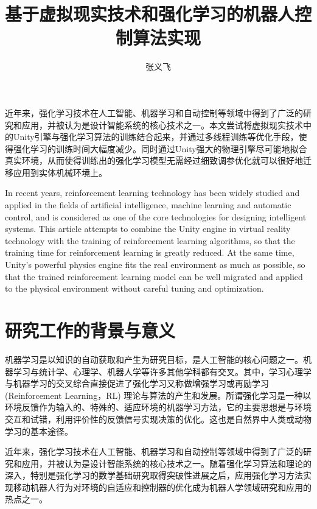 \documentclass[bachelor]{thesis-uestc}
\title{基于虚拟现实技术和强化学习的机器人控制算法实现}
\author{张义飞}
\begin{document}
	
	\begin{chineseabstract}
		近年来，强化学习技术在人工智能、机器学习和自动控制等领域中得到了广泛的研究和应用，并被认为是设计智能系统的核心技术之一。本文尝试将虚拟现实技术中的Unity引擎与强化学习算法的训练结合起来，并通过多线程训练等优化手段，使得强化学习的训练时间大幅度减少。同时通过Unity强大的物理引擎尽可能地拟合真实环境，从而使得训练出的强化学习模型无需经过细致调参优化就可以很好地迁移应用到实体机械环境上。
		
	\end{chineseabstract}
	
	\begin{englishabstract}
		In recent years, reinforcement learning technology has been widely studied and applied in the fields of artificial intelligence, machine learning and automatic control, and is considered as one of the core technologies for designing intelligent systems. This article attempts to combine the Unity engine in virtual reality technology with the training of reinforcement learning algorithms, so that the training time for reinforcement learning is greatly reduced. At the same time, Unity's powerful physics engine fits the real environment as much as possible, so that the trained reinforcement learning model can be well migrated and applied to the physical environment without careful tuning and optimization.
		
	\end{englishabstract}
	
	\thesistableofcontents
	
	\thesischapterexordium
	
	\section{研究工作的背景与意义}
	
	机器学习是以知识的自动获取和产生为研究目标，是人工智能的核心问题之一。机器学习与统计学、心理学、机器人学等许多其他学科都有交叉。其中，学习心理学与机器学习的交叉综合直接促进了强化学习又称做增强学习或再励学习(Reinforcement Learning，RL) 理论与算法的产生和发展。所谓强化学习是一种以环境反馈作为输入的、特殊的、适应环境的机器学习方法，它的主要思想是与环境交互和试错，利用评价性的反馈信号实现决策的优化。这也是自然界中人类或动物学习的基本途径。
	
	近年来，强化学习技术在人工智能、机器学习和自动控制等领域中得到了广泛的研究和应用，并被认为是设计智能系统的核心技术之一。随着强化学习算法和理论的深入，特别是强化学习的数学基础研究取得突破性进展之后，应用强化学习方法实现移动机器人行为对环境的自适应和控制器的优化成为机器人学领域研究和应用的热点之一。
	
\end{document}
